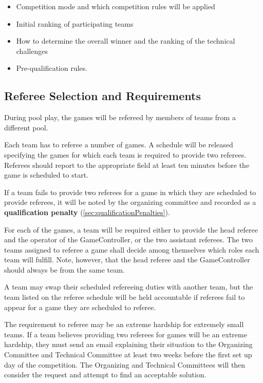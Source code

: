\begin{itemize}
  \item Competition mode and which competition rules will be applied
  \item Initial ranking of participating teams
  \item How to determine the overall winner and the ranking of the technical challenges
  \item Pre-qualification rules.
\end{itemize}

\subsection{Referee Selection and Requirements}
\label{sec:refSelection}
During pool play, the games will be refereed by members of teams from a different pool.

Each team has to referee a number of games. A schedule will be released specifying the games for which each team is required to provide two referees. Referees should report to the appropriate field at least ten minutes before the game is scheduled to start.

If a team fails to provide two referees for a game in which they are scheduled to provide referees, it will be noted by the organizing committee and recorded as a \textbf{qualification penalty} (\cref{sec:qualificationPenalties}).

For each of the games, a team will be required either to provide the head referee and the operator of the GameController, or the two assistant referees.  The two teams assigned to referee a game shall decide among themselves which roles each team will fulfill. Note, however, that the head referee and the GameController should always be from the same team.

A team may swap their scheduled refereeing duties with another team, but the team listed on the referee schedule will be held accountable if referees fail to appear for a game they are scheduled to referee.

The requirement to referee may be an extreme hardship for extremely small teams.  If a team believes providing two referees for games will be an extreme hardship, they must send an email explaining their situation to the Organizing Committee and Technical Committee at least two weeks before the first set up day of the competition.  The Organizing and Technical Committees will then consider the request and attempt to find an acceptable solution.

